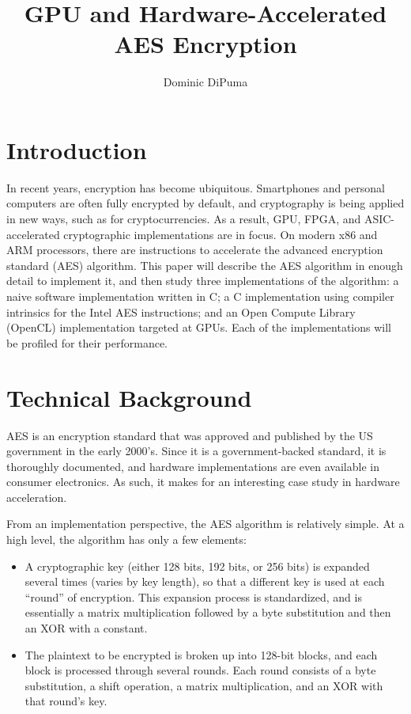 \documentclass[a4paper,10pt,conference]{IEEEtran}
\title{GPU and Hardware-Accelerated AES Encryption}
\author{Dominic DiPuma}
\begin{document}
\maketitle

\section{Introduction}

In recent years, encryption has become ubiquitous.  Smartphones and personal computers are often fully encrypted by default, and cryptography is being applied in new ways, such as for cryptocurrencies.  As a result, GPU, FPGA, and ASIC-accelerated cryptographic implementations are in focus.  On modern x86 and ARM processors, there are instructions to accelerate the advanced encryption standard (AES) algorithm.  This paper will describe the AES algorithm in enough detail to implement it, and then study three implementations of the algorithm: a naive software implementation written in C; a C implementation using compiler intrinsics for the Intel AES instructions; and an Open Compute Library (OpenCL) implementation targeted at GPUs.  Each of the implementations will be profiled for their performance.

\section{Technical Background}

AES is an encryption standard that was approved and published by the US government in the early 2000's.  Since it is a government-backed standard, it is thoroughly documented, and hardware implementations are even available in consumer electronics.  As such, it makes for an interesting case study in hardware acceleration.

From an implementation perspective, the AES algorithm is relatively simple.  At a high level, the algorithm has only a few elements:
\begin{itemize}
 \item A cryptographic key (either 128 bits, 192 bits, or 256 bits) is expanded several times (varies by key length), so that a different key is used at each ``round'' of encryption.  This expansion process is standardized, and is essentially a matrix multiplication followed by a byte substitution and then an XOR with a constant.
 \item The plaintext to be encrypted is broken up into 128-bit blocks, and each block is processed through several rounds.  Each round consists of a byte substitution, a shift operation, a matrix multiplication, and an XOR with that round's key.
\end{itemize}
\end{document}
